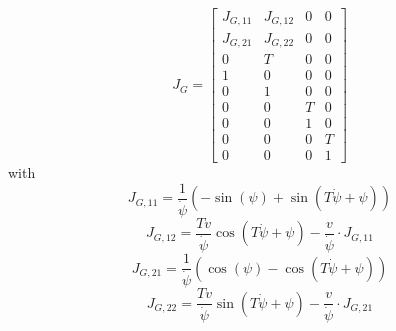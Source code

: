 \documentclass[conference]{IEEEtran}
\begin{document}
\begin{equation}J_G=\left[\begin{matrix}J_{G,11} & J_{G,12} & 0 & 0\\ J_{G,21} & J_{G,22} & 0 & 0\\0 & T & 0 & 0\\1 & 0 & 0 & 0\\0 & 1 & 0 & 0\\0 & 0 & T & 0\\0 & 0 & 1 & 0\\0 & 0 & 0 & T\\0 & 0 & 0 & 1\end{matrix}\right]\end{equation}
with
\begin{equation}J_{G,11}=\frac{1}{\dot\psi} \left(- \sin{\left (\psi \right )} + \sin{\left (T \dot\psi + \psi \right )}\right)\end{equation}
\begin{equation}J_{G,12}=\frac{T v}{\dot\psi} \cos{\left (T \dot\psi + \psi \right )} - \frac{v}{\dot\psi} \cdot J_{G,11}\end{equation}
\begin{equation}J_{G,21}=\frac{1}{\dot\psi} \left(\cos{\left (\psi \right )} - \cos{\left (T \dot\psi + \psi \right )}\right)\end{equation}
\begin{equation}J_{G,22}=\frac{T v}{\dot\psi} \sin{\left (T \dot\psi + \psi \right )} - \frac{v}{\dot\psi} \cdot J_{G,21}\end{equation}



\ifCLASSOPTIONcaptionsoff
  \newpage
\fi





{}

%
%
\end{document}
